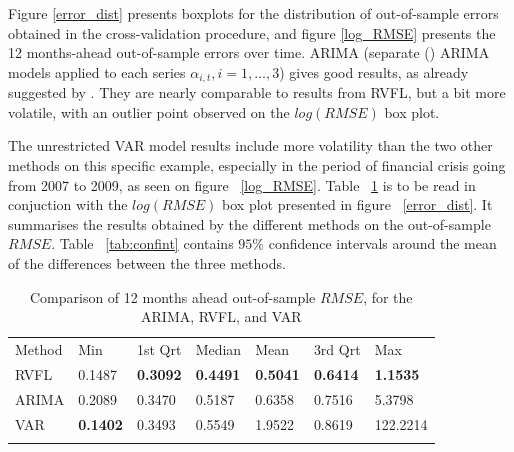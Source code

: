 Figure \ref{error_dist} presents boxplots for the distribution of out-of-sample errors obtained in the cross-validation procedure, and figure \ref{log_RMSE} presents the 12 months-ahead out-of-sample errors over time. ARIMA (separate (\cite{hyndman2008automatic}) ARIMA models applied to each series $\alpha_{i, t}, i = 1, \ldots, 3$) gives good results, as already suggested by  \cite{diebold2006forecasting}. They are nearly comparable to results from RVFL, but a bit more volatile, with an outlier point observed on the $log(RMSE)$ box plot.

\medskip

The unrestricted VAR model results include more volatility than the two other methods on this specific  example, especially in the period of financial crisis going from 2007 to 2009, as seen on figure ~\ref{log_RMSE}. Table ~\ref{tab:benchmark} is to be read in conjuction with the $log(RMSE)$ box plot presented in figure ~\ref{error_dist}. It summarises the results obtained by the different methods on the out-of-sample $RMSE$. Table ~\ref{tab:confint} contains $95\%$ confidence intervals around the mean of the differences between the three methods.

\medskip

\begin{table}
\begin{center}
\caption{Comparison of 12 months ahead out-of-sample $RMSE$, for the ARIMA, RVFL, and VAR}
\label{tab:benchmark}       %
\begin{tabular}{lllllll}
\hline\noalign{\smallskip}
Method & Min & 1st Qrt  & Median & Mean  & 3rd Qrt  & Max  \\
\noalign{\smallskip}\hline\noalign{\smallskip}
  RVFL & 0.1487 & \textbf{0.3092} & \textbf{0.4491} & \textbf{0.5041} & \textbf{0.6414} & \textbf{1.1535} \\
  ARIMA & 0.2089 & 0.3470 & 0.5187 & 0.6358 & 0.7516 & 5.3798\\
  VAR & \textbf{0.1402} & 0.3493 & 0.5549 & 1.9522  & 0.8619 & 122.2214 \\
\noalign{\smallskip}\hline
\end{tabular}
\end{center}
\end{table}


